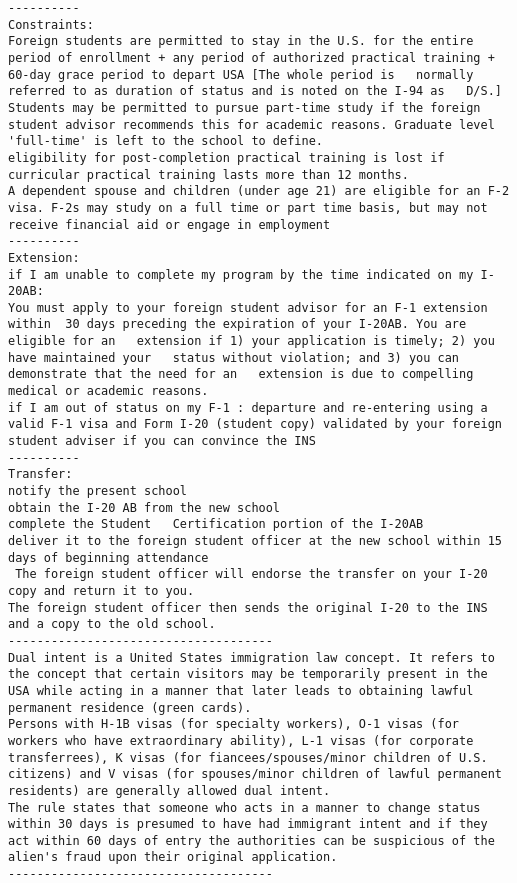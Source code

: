\documentclass[oneside, article]{memoir}
\begin{document}
\begin{verbatim}
----------
Constraints:
Foreign students are permitted to stay in the U.S. for the entire period of enrollment + any period of authorized practical training + 60-day grace period to depart USA [The whole period is   normally referred to as duration of status and is noted on the I-94 as   D/S.]
Students may be permitted to pursue part-time study if the foreign student advisor recommends this for academic reasons. Graduate level 'full-time' is left to the school to define.
eligibility for post-completion practical training is lost if curricular practical training lasts more than 12 months.
A dependent spouse and children (under age 21) are eligible for an F-2 visa. F-2s may study on a full time or part time basis, but may not receive financial aid or engage in employment
----------
Extension:
if I am unable to complete my program by the time indicated on my I-20AB:
You must apply to your foreign student advisor for an F-1 extension within  30 days preceding the expiration of your I-20AB. You are eligible for an   extension if 1) your application is timely; 2) you have maintained your   status without violation; and 3) you can demonstrate that the need for an   extension is due to compelling medical or academic reasons.
if I am out of status on my F-1 : departure and re-entering using a valid F-1 visa and Form I-20 (student copy) validated by your foreign student adviser if you can convince the INS
----------
Transfer:
notify the present school
obtain the I-20 AB from the new school
complete the Student   Certification portion of the I-20AB
deliver it to the foreign student officer at the new school within 15 days of beginning attendance
 The foreign student officer will endorse the transfer on your I-20 copy and return it to you.
The foreign student officer then sends the original I-20 to the INS and a copy to the old school.
-------------------------------------
Dual intent is a United States immigration law concept. It refers to the concept that certain visitors may be temporarily present in the USA while acting in a manner that later leads to obtaining lawful permanent residence (green cards).
Persons with H-1B visas (for specialty workers), O-1 visas (for workers who have extraordinary ability), L-1 visas (for corporate transferrees), K visas (for fiancees/spouses/minor children of U.S. citizens) and V visas (for spouses/minor children of lawful permanent residents) are generally allowed dual intent.
The rule states that someone who acts in a manner to change status within 30 days is presumed to have had immigrant intent and if they act within 60 days of entry the authorities can be suspicious of the alien's fraud upon their original application.
-------------------------------------
\end{verbatim}
\end{document}
